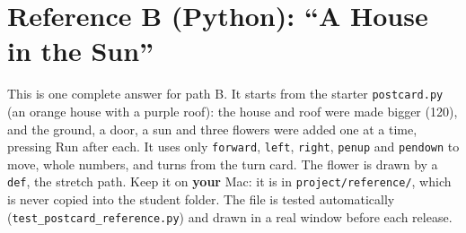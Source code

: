 \documentclass[track=junior,level=3,teacher]{kidscode}
\begin{document}
\section{Reference B (Python): \enquote{A House in the Sun}}
This is one complete answer for path B. It starts from the starter \texttt{postcard.py} (an orange
house with a purple roof): the house and roof were made bigger (120), and the ground, a door, a sun
and three flowers were added one at a time, pressing Run after each. It uses only \texttt{forward},
\texttt{left}, \texttt{right}, \texttt{penup} and \texttt{pendown} to move, whole numbers, and turns from
the turn card. The flower is drawn by a \texttt{def}, the stretch path. Keep it on \textbf{your} Mac: it
is in \texttt{project/reference/}, which is never copied into the student folder. The file is tested
automatically (\texttt{test\_postcard\_reference.py}) and drawn in a real window before each release.

\begin{center}
\end{center}

\end{document}
